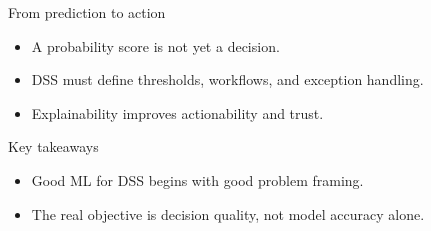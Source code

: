 \documentclass[aspectratio=169,11pt]{beamer}
\begin{document}
\begin{frame}{From prediction to action}
  \begin{itemize}
    \item A probability score is not yet a decision.
    \item DSS must define thresholds, workflows, and exception handling.
    \item Explainability improves actionability and trust.
  \end{itemize}
\end{frame}


\begin{frame}{Key takeaways}
  \begin{itemize}
    \item Good ML for DSS begins with good problem framing.
    \item The real objective is decision quality, not model accuracy alone.
  \end{itemize}
\end{frame}
\end{document}

